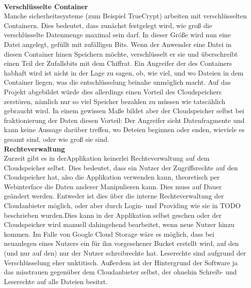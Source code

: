 \documentclass[12pt,a4paper,bibliography=totocnumbered,listof=totocnumbered]{scrartcl}
\begin{document}
\\\textbf{Verschlüsselte Container}\\
Manche sicherheitssysteme (zum Beispiel TrueCrypt) arbeiten mit verschlüsselten Containern. Dies bedeutet, dass zunächst festgelegt wird, wie groß die verschlüsselte Datenmenge maximal sein darf. In dieser Größe wird nun eine Datei angelegt, gefüllt mit zufälligen Bits. Wenn der Anwender eine Datei in diesen Container hinen Speichern möchte, verschlüsselt er sie und überschreibt einen Teil der Zufallsbits mit dem Chiffrat. Ein Angreifer der des Containers habhaft wird ist nicht in der Lage zu sagen, ob, wie viel, und wo Dateien in dem Container liegen, was die entschlüsselung beinahe unmöglich macht. Auf das Projekt abgebildet würde dies allerdings einen Vorteil des Cloudspeichers zerstören, nämlich nur so viel Speicher bezahlen zu müssen wie tatscählich gebraucht wird. In einem gewissen Maße bildet aber der Cloudspeicher selbst bei fraktionierung der Daten diesen Vorteil: Der Angreifer sieht Datenfragmente und kann keine Aussage darüber treffen, wo Deteien beginnen oder enden, wieviele es gesamt sind, oder wie groß sie sind.
\\\textbf{Rechteverwaltung}\\
Zurzeit gibt es in derApplikation keinerlei Rechteverwaltung auf dem Cloudspeicher selbst. Dies bedeutet, dass ein Nutzer der Zugriffsrechte auf den Cloudspeicher hat, also die Applikation verwenden kann, theoretisch per Webinterface die Daten anderer Manipulieren kann. Dies muss auf Dauer geändert werden. Entweder ist dies über die interne Rechteverwaltung der Cloudanbieter möglich, oder aber durch Login- und Providing wie sie in TODO beschrieben wurden.Dies kann in der Applikation selbst geschen oder der Cloudspeicher wird manuell dahingehend bearbeitet, wenn neue Nutzer hinzu kommen. Im Falle von Google Cloud Storage wäre es möglich, dass bei neuanlegen eines Nutzers ein für ihn vorgesehener Bucket erstellt wird, auf den (und nur auf den) nur der Nutzer schreibrechte hat. Leserechte sind aufgrund der Verschlüsselung eher unktitisch. Außerdem ist der Hintergrund der Software ja das misstrauen gegenüber dem Cloudanbieter selbst, der ohnehin Schreib- und Leserechte auf alle Dateien besitzt.
\pagebreak


	
 
 
 
\end{document}

